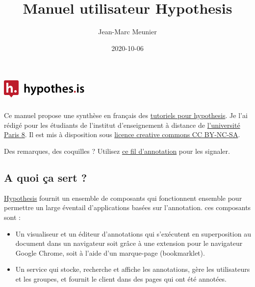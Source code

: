 \documentclass[
]{book}
\title{Manuel utilisateur Hypothesis}
\author{Jean-Marc Meunier}
\date{2020-10-06}
\providecommand{\tightlist}{%
  \setlength{\itemsep}{0pt}\setlength{\parskip}{0pt}}
\begin{document}
\maketitle

{
\setcounter{tocdepth}{1}
\tableofcontents
}
\hypertarget{section}{%
\chapter*{\texorpdfstring{\protect\includegraphics{img/hypothesislogomark.png}}{}}\label{section}}

Ce manuel propose une synthèse en français des \href{https://web.hypothes.is/help-categories/tutorials/}{tutoriels pour hypothesis}. Je l'ai rédigé pour les étudiants de l'institut d'enseignement à distance de \href{https://www.univ-paris8.fr/}{l'université Paris 8}. Il est mis à disposition sous \href{https://creativecommons.org/licenses/by-nc-sa/3.0/fr/}{licence creative commons CC BY-NC-SA}.

Des remarques, des coquilles ? Utilisez \href{https://hyp.is/go?url=https\%3A\%2F\%2Fjmeunierp8.github.io\%2FGuide-utilisateur-Hypothesis\%2F\&group=__world__}{ce fil d'annotation} pour les signaler.

\hypertarget{a-quoi-uxe7a-sert}{%
\section*{A quoi ça sert ?}\label{a-quoi-uxe7a-sert}}

\href{https://web.hypothes.is/}{Hypothesis} fournit un ensemble de composants qui fonctionnent ensemble pour permettre un large éventail d'applications basées sur l'annotation. ces composants sont :

\begin{itemize}
\tightlist
\item
  Un visualiseur et un éditeur d'annotations qui s'exécutent en superposition au document dans un navigateur soit grâce à une extension pour le navigateur Google Chrome, soit à l'aide d'un marque-page (bookmarklet).
\item
  Un service qui stocke, recherche et affiche les annotations, gère les utilisateurs et les groupes, et fournit le client dans des pages qui ont été annotées.
\end{itemize}
\end{document}
